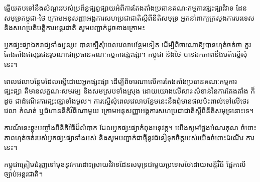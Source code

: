 ឆ្លើយតបទៅនឹងសំណួររបស់ប្រព័ន្ធផ្សព្វផ្សាយអំពីការតែងតាំងប្រធានគណៈកម្មការផ្សះផ្សាវិវាទ ដែនសមុទ្រកម្ពុជា-ថៃ ក្រោមអនុសញ្ញាអង្គការសហប្រជាជាតិស្តីពីនីតិសមុទ្រ អ្នកនាំពាក្យក្រសួងការបរទេស និងសហប្រតិបត្តិការអន្តរជាតិ សូមបញ្ជាក់ដូចខាងក្រោម៖

អ្នកផ្សះផ្សាឯករាជ្យទាំងបួនរូប បានស្នើសុំពេលវេលាបន្ថែមទៀត ដើម្បីពិចារណាឱ្យបានហ្មត់ចត់ថា គួរតែងតាំងឥស្សរជនរូបណាជាប្រធានគណៈកម្មការផ្សះផ្សា។ កម្ពុជា និងថៃ បានឯកភាពនឹងមតិស្នើសុំនេះ។

ពេលវេលាបន្ថែមដែលស្នើដោយអ្នកផ្សះផ្សា ដើម្បីពិចារណាលើការតែងតាំងប្រធានគណៈកម្មការ ផ្សះផ្សា គឺមានលក្ខណៈសមរម្យ និងសមស្របទាំងស្រុង ដោយយោងលើសារៈសំខាន់នៃការតែងតាំង ក៏ដូច ជាដំណើរការផ្សះផ្សាទាំងមូល។ ការស្នើសុំពេលវេលាបន្ថែមនេះនឹងពុំមានផលប៉ះពាល់ទៅលើថេរវេលា កំណត់ ឬជំហាននីតិវិធីណាមួយ ក្រោមអនុសញ្ញាអង្គការសហប្រជាជាតិស្តីពីនីតិសមុទ្រនោះទេ។

ការណ៍នេះឆ្លុះបញ្ចាំងពីនីតិវិធីដ៏លំបាក ដែលអ្នកផ្សះផ្សាកំពុងអនុវត្ត។ យើងសូមថ្លែងអំណរគុណ ចំពោះភាពហ្មត់ចត់របស់អ្នកផ្សះផ្សាទាំងអស់ និងសូមបញ្ជាក់ជាថ្មីនូវជំនឿទុកចិត្តរបស់យើងចំពោះដំណើរ ការនេះ។

កម្ពុជាត្រៀមជំរុញទៅមុខនូវការដោះស្រាយវិវាទដែនសមុទ្រជាមួយប្រទេសថៃដោយសន្តិវិធី ផ្អែកលើ ច្បាប់អន្តរជាតិ។